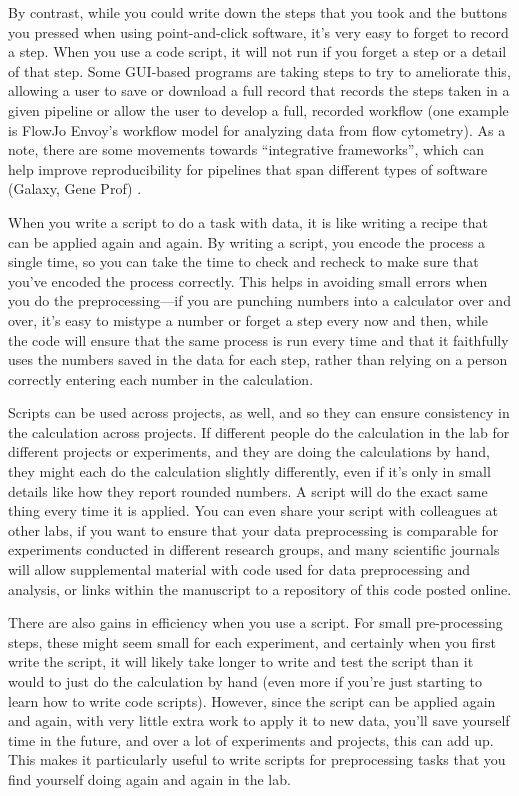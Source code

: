 \documentclass[]{tufte-book}
\begin{document}
By contrast, while you could write down the steps that you took and the buttons
you pressed when using point-and-click software, it's very easy to forget to
record a step. When you use a code script, it will not run if you forget a step
or a detail of that step. Some GUI-based programs are taking steps to try to
ameliorate this, allowing a user to save or download a full record that records
the steps taken in a given pipeline or allow the user to develop a full,
recorded workflow (one example is FlowJo Envoy's workflow model for analyzing
data from flow cytometry). As a note, there are some movements towards
``integrative frameworks'', which can help improve reproducibility for pipelines
that span different types of software (Galaxy, Gene Prof) \citep{nekrutenko2012next}.

When you write a script to do a task with data, it is like writing a recipe that
can be applied again and again. By writing a script, you encode the process a
single time, so you can take the time to check and recheck to make sure that
you've encoded the process correctly. This helps in avoiding small errors when
you do the preprocessing---if you are punching numbers into a calculator over
and over, it's easy to mistype a number or forget a step every now and then,
while the code will ensure that the same process is run every time and that it
faithfully uses the numbers saved in the data for each step, rather than relying
on a person correctly entering each number in the calculation.

Scripts can be used across projects, as well, and so they can ensure consistency
in the calculation across projects. If different people do the calculation in
the lab for different projects or experiments, and they are doing the
calculations by hand, they might each do the calculation slightly differently,
even if it's only in small details like how they report rounded numbers. A
script will do the exact same thing every time it is applied. You can even share
your script with colleagues at other labs, if you want to ensure that your data
preprocessing is comparable for experiments conducted in different research
groups, and many scientific journals will allow supplemental material with
code used for data preprocessing and analysis, or links within the manuscript
to a repository of this code posted online.

There are also gains in efficiency when you use a script. For small
pre-processing steps, these might seem small for each experiment, and certainly
when you first write the script, it will likely take longer to write and test
the script than it would to just do the calculation by hand (even more if
you're just starting to learn how to write code scripts). However, since the
script can be applied again and again, with very little extra work to apply it
to new data, you'll save yourself time in the future, and over a lot of
experiments and projects, this can add up. This makes it particularly useful to
write scripts for preprocessing tasks that you find yourself doing again and
again in the lab.
\end{document}
